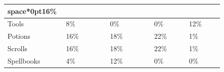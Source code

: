 \begin{longtable}{|>{\RaggedRight}p{0.15554\linewidth}|>{\RaggedRight}p{0.19251\linewidth}|>{\RaggedRight}p{0.19844\linewidth}|>{\RaggedRight}p{0.15446\linewidth}|>{\RaggedRight}p{0.15619\linewidth}|}
space*{0pt}16\%\\ \hline \hspace*{0pt}\ignorespaces{}\hspace*{0pt}Tools\footnotemark[37]&\hspace*{0pt}\ignorespaces{}\hspace*{0pt}8\%&\hspace*{0pt}\ignorespaces{}\hspace*{0pt}0\%&\hspace*{0pt}\ignorespaces{}\hspace*{0pt}0\%&\hspace*{0pt}\ignorespaces{}\hspace*{0pt}12\%\\ \hline \hspace*{0pt}\ignorespaces{}\hspace*{0pt}Potions\footnotemark[38]&\hspace*{0pt}\ignorespaces{}\hspace*{0pt}16\%&\hspace*{0pt}\ignorespaces{}\hspace*{0pt}18\%&\hspace*{0pt}\ignorespaces{}\hspace*{0pt}22\%&\hspace*{0pt}\ignorespaces{}\hspace*{0pt}1\%\\ \hline \hspace*{0pt}\ignorespaces{}\hspace*{0pt}Scrolls\footnotemark[39]&\hspace*{0pt}\ignorespaces{}\hspace*{0pt}16\%&\hspace*{0pt}\ignorespaces{}\hspace*{0pt}18\%&\hspace*{0pt}\ignorespaces{}\hspace*{0pt}22\%&\hspace*{0pt}\ignorespaces{}\hspace*{0pt}1\%\\ \hline \hspace*{0pt}\ignorespaces{}\hspace*{0pt}Spellbooks\footnotemark[40]&\hspace*{0pt}\ignorespaces{}\hspace*{0pt}4\%&\hspace*{0pt}\ignorespaces{}\hspace*{0pt}12\%&\hspace*{0pt}\ignorespaces{}\hspace*{0pt}0\%&\hspace*{0pt}\ignorespaces{}\hspace*{0pt}0\%\\ \hline 
\end{longtable}
